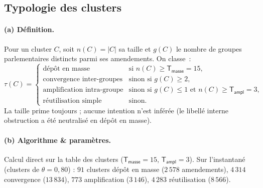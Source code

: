 \documentclass[11pt,a4paper]{article}
\newcommand{\param}[1]{\ensuremath{\mathsf{#1}}}
\begin{document}
\subsection{Typologie des clusters}\label{sec:typo}

\paragraph{(a) Définition.} Pour un cluster $C$, soit $n(C)=|C|$ sa taille et
$g(C)$ le nombre de groupes parlementaires distincts parmi ses amendements. On
classe~:
\[
\tau(C)=\begin{cases}
\text{dépôt en masse} & \text{si } n(C)\ge \param{T_{masse}}=15,\\[2pt]
\text{convergence inter-groupes} & \text{sinon si } g(C)\ge 2,\\[2pt]
\text{amplification intra-groupe} & \text{sinon si } g(C)\le 1 \text{ et } n(C)\ge \param{T_{ampl}}=3,\\[2pt]
\text{réutilisation simple} & \text{sinon.}
\end{cases}
\]
La taille prime toujours ; aucune intention n'est inférée (le libellé interne
\og{}obstruction\fg{} a été neutralisé en \og{}dépôt en masse\fg{}).

\paragraph{(b) Algorithme \& paramètres.} Calcul direct sur la table des clusters
($\param{T_{masse}}=15$, $\param{T_{ampl}}=3$). Sur l'instantané (clusters de
$\theta=0{,}80$) : $91$ clusters \og{}dépôt en masse\fg{} ($2\,578$ amendements),
$4\,314$ \og{}convergence\fg{} ($13\,834$), $773$ \og{}amplification\fg{}
($3\,146$), $4\,283$ \og{}réutilisation\fg{} ($8\,566$).
\end{document}
